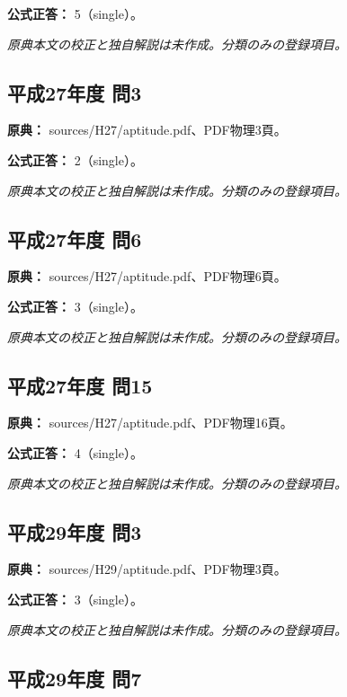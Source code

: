 \textbf{公式正答：} 5（single）。

\par\textit{原典本文の校正と独自解説は未作成。分類のみの登録項目。}

\subsection{平成27年度 問3}
\label{q:h27-reg-apt-03}

\noindent\textbf{原典：} sources/H27/aptitude.pdf、PDF物理3頁。

\textbf{公式正答：} 2（single）。

\par\textit{原典本文の校正と独自解説は未作成。分類のみの登録項目。}

\subsection{平成27年度 問6}
\label{q:h27-reg-apt-06}

\noindent\textbf{原典：} sources/H27/aptitude.pdf、PDF物理6頁。

\textbf{公式正答：} 3（single）。

\par\textit{原典本文の校正と独自解説は未作成。分類のみの登録項目。}

\subsection{平成27年度 問15}
\label{q:h27-reg-apt-15}

\noindent\textbf{原典：} sources/H27/aptitude.pdf、PDF物理16頁。

\textbf{公式正答：} 4（single）。

\par\textit{原典本文の校正と独自解説は未作成。分類のみの登録項目。}

\subsection{平成29年度 問3}
\label{q:h29-reg-apt-03}

\noindent\textbf{原典：} sources/H29/aptitude.pdf、PDF物理3頁。

\textbf{公式正答：} 3（single）。

\par\textit{原典本文の校正と独自解説は未作成。分類のみの登録項目。}

\subsection{平成29年度 問7}
\label{q:h29-reg-apt-07}

